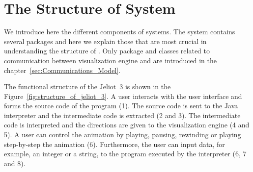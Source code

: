 \section{The Structure of \jel{} System}
\label{sec:The_Components_of_the_Jeliot_3_System}

We introduce here the different components of \jel{} systems. The system
contains several packages and here we explain those that are most crucial
in understanding the structure of \jel{}. Only package and classes related
to communication between visualization engine and \djava{} are introduced
in the chapter~\ref{sec:Communications_Model}.

The functional structure of the Jeliot~3 is shown in the
Figure~\ref{fig:structure_of_jeliot_3}. A user interacts with the user
interface and forms the source code of the program (1). The source code
is sent to the Java interpreter and the intermediate code is extracted
(2 and 3). The intermediate code is interpreted and the directions are
given to the visualization engine (4 and 5). A user can control the
animation by playing, pausing, rewinding or playing step-by-step the
animation (6). Furthermore, the user can input data, for example,
an integer or a string, to the program executed by the interpreter (6, 7 and 8).

